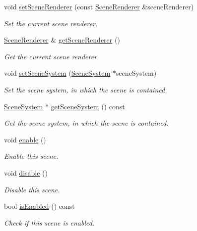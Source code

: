 \begin{DoxyCompactItemize}
void \mbox{\hyperlink{classec_1_1_scene_a4a000b3820dfcf578ed80bae3bf5f432}{set\+Scene\+Renderer}} (const \mbox{\hyperlink{classec_1_1_scene_renderer}{Scene\+Renderer}} \&scene\+Renderer)
\begin{DoxyCompactList}\small\item\em Set the current scene renderer. \end{DoxyCompactList}\item 
\mbox{\hyperlink{classec_1_1_scene_renderer}{Scene\+Renderer}} \& \mbox{\hyperlink{classec_1_1_scene_a73f48395e9442f3e6647dd9503050b91}{get\+Scene\+Renderer}} ()
\begin{DoxyCompactList}\small\item\em Get the current scene renderer. \end{DoxyCompactList}\item 
void \mbox{\hyperlink{classec_1_1_scene_a87a6277fea206956c0a7175cf308ece0}{set\+Scene\+System}} (\mbox{\hyperlink{classec_1_1_scene_system}{Scene\+System}} $\ast$scene\+System)
\begin{DoxyCompactList}\small\item\em Set the scene system, in which the scene is contained. \end{DoxyCompactList}\item 
\mbox{\hyperlink{classec_1_1_scene_system}{Scene\+System}} $\ast$ \mbox{\hyperlink{classec_1_1_scene_a95b79ca1dc856cb50262ab4b9e72465f}{get\+Scene\+System}} () const
\begin{DoxyCompactList}\small\item\em Get the scene system, in which the scene is contained. \end{DoxyCompactList}\item 
void \mbox{\hyperlink{classec_1_1_scene_ab1788ac3be0db2d82ee2f8c5fa0cecef}{enable}} ()
\begin{DoxyCompactList}\small\item\em Enable this scene. \end{DoxyCompactList}\item 
void \mbox{\hyperlink{classec_1_1_scene_a05bf59f23abb809000ad17bdb00cab94}{disable}} ()
\begin{DoxyCompactList}\small\item\em Disable this scene. \end{DoxyCompactList}\item 
bool \mbox{\hyperlink{classec_1_1_scene_a0748d645ee5204e64d674c1b10b26864}{is\+Enabled}} () const
\begin{DoxyCompactList}\small\item\em Check if this scene is enabled. \end{DoxyCompactList}\end{DoxyCompactItemize}
